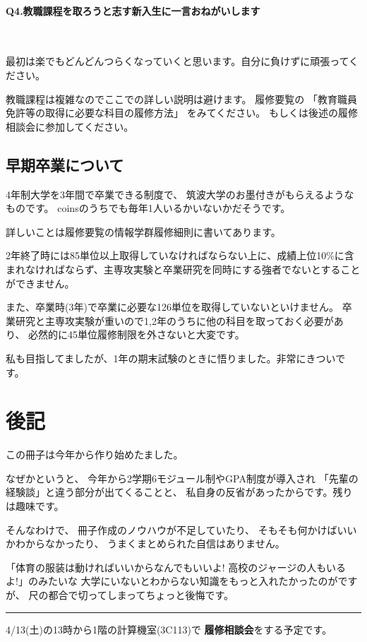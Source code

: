 \documentclass[a4j]{jsarticle}
\newcommand{\note}[1]{{\color{red} #1}}
\newcommand{\RA}{{\color{red}\large RED ALERT}}
\newcommand{\bold}[1]{{\bfseries #1}}
\newcommand{\parapara}[1]{\paragraph{#1}~\par}
\renewcommand{\note}[1]{}\renewcommand{\RA}{}
\begin{document}
\parapara{Q4.教職課程を取ろうと志す新入生に一言おねがいします}
最初は楽でもどんどんつらくなっていくと思います。自分に負けずに頑張ってください。

\vspace{4mm}
教職課程は複雑なのでここでの詳しい説明は避けます。
履修要覧の
「教育職員免許等の取得に必要な科目の履修方法」
をみてください。
もしくは後述の履修相談会に参加してください。

\note{教職まんのokもらった}


\subsection{早期卒業について}
4年制大学を3年間で卒業できる制度で、
筑波大学のお墨付きがもらえるようなものです。
coinsのうちでも毎年1人いるかいないかだそうです。

詳しいことは履修要覧の情報学群履修細則に書いてあります。

2年終了時には85単位以上取得していなければならない上に、成績上位10\%に含まれなければならず、主専攻実験と卒業研究を同時にする強者でないとすることができません。

また、卒業時(3年)で卒業に必要な126単位を取得していないといけません。
卒業研究と主専攻実験が重いので1,2年のうちに他の科目を取っておく必要があり、
必然的に45単位履修制限を外さないと大変です。

私も目指してましたが、1年の期末試験のときに悟りました。非常にきついです。


\section{後記}
この冊子は今年から作り始めたました。

なぜかというと、
今年から2学期6モジュール制やGPA制度が導入され
「先輩の経験談」と違う部分が出てくることと、
私自身の反省があったからです。残りは趣味です。

そんなわけで、
冊子作成のノウハウが不足していたり、
そもそも何かけばいいかわからなかったり、
うまくまとめられた自信はありません。

「体育の服装は動ければいいからなんでもいいよ!
高校のジャージの人もいるよ!」のみたいな
大学にいないとわからない知識をもっと入れたかったのがですが、
尺の都合で切ってしまってちょっと後悔です。

\note{土日の履修の奴書くならここ}


\vspace{\fill}
\noindent\rule{\textwidth}{0.1mm}

4/13(土)の13時から1階の計算機室(3C113)で
\bold{履修相談会}をする予定です。
\end{document}
